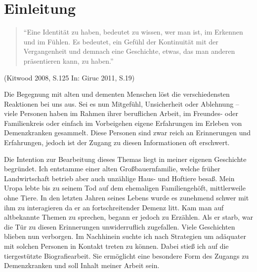\section{Einleitung}
\label{sec:k1_Einleitung}

\begin{quotation}
"`Eine Identität zu haben, bedeutet zu wissen, wer man ist, im Erkennen und im Fühlen. Es bedeutet, ein Gefühl der Kontinuität mit der Vergangenheit und demnach eine Geschichte, etwas, das man anderen präsentieren kann, zu haben."'
\end{quotation}

\begin{flushright}
(Kitwood 2008, S.125 In: Giruc 2011, S.19)
\end{flushright}

Die Begegnung mit alten und dementen Menschen löst die verschiedensten Reaktionen bei uns aus. Sei es nun Mitgefühl, Unsicherheit oder Ablehnung -- viele Personen haben im Rahmen ihrer beruflichen Arbeit, im Freundes- oder Familienkreis oder einfach im Vorbeigehen eigene Erfahrungen im Erleben von Demenzkranken gesammelt. Diese Personen sind zwar reich an Erinnerungen und Erfahrungen, jedoch ist der Zugang zu diesen Informationen oft erschwert.
 
Die Intention zur Bearbeitung dieses Themas liegt in meiner eigenen Geschichte begründet. Ich entstamme einer alten Großbauernfamilie, welche früher Landwirtschaft betrieb aber auch unzählige Haus- und Hoftiere besaß. Mein Uropa lebte bis zu seinem Tod auf dem ehemaligen Familiengehöft, mittlerweile ohne Tiere. In den letzten Jahren seines Lebens wurde es zunehmend schwer mit ihm zu interagieren da er an fortschreitender Demenz litt. Kam man auf altbekannte Themen zu sprechen, begann er jedoch zu Erzählen. Als er starb, war die Tür zu diesen Erinnerungen unwiderruflich zugefallen. Viele Geschichten blieben nun verborgen. Im Nachhinein suchte ich nach Strategien um adäquater mit solchen Personen in Kontakt treten zu können. Dabei stieß ich auf die tiergestützte Biografiearbeit. Sie ermöglicht eine besondere Form des Zugangs zu Demenzkranken und soll Inhalt meiner Arbeit sein.

